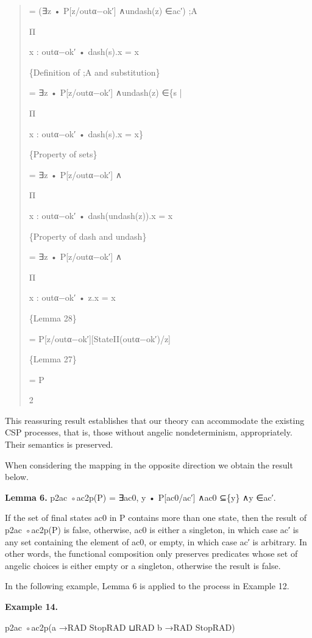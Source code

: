 \documentclass[11pt]{article}
\begin{document}
\begin{quote}\small\raggedright
= (∃z • P[z/outα−ok′] ∧undash(z) ∈ac′) ;A
\par
Π
\par
x : outα−ok′ • dash(s).x = x
\par
\{Definition of ;A and substitution\}
\par
= ∃z • P[z/outα−ok′] ∧undash(z) ∈\{s |
\par
Π
\par
x : outα−ok′ • dash(s).x = x\}
\par
\{Property of sets\}
\par
= ∃z • P[z/outα−ok′] ∧
\par
Π
\par
x : outα−ok′ • dash(undash(z)).x = x
\par
\{Property of dash and undash\}
\par
= ∃z • P[z/outα−ok′] ∧
\par
Π
\par
x : outα−ok′ • z.x = x
\par
\{Lemma 28\}
\par
= P[z/outα−ok′][StateII(outα−ok′)/z]
\par
\{Lemma 27\}
\par
= P
\par
2
\end{quote}

This reassuring result establishes that our theory can accommodate the existing CSP processes, that is, those without angelic nondeterminism, appropriately. Their semantics is preserved.

When considering the mapping in the opposite direction we obtain the result below.

\noindent\textbf{Lemma 6.} p2ac ◦ac2p(P) = ∃ac0, y • P[ac0/ac′] ∧ac0 ⊆\{y\} ∧y ∈ac′.


If the set of final states ac0 in P contains more than one state, then the result of p2ac ◦ac2p(P) is false, otherwise, ac0 is either a singleton, in which case ac′ is any set containing the element of ac0, or empty, in which case ac′ is arbitrary. In other words, the functional composition only preserves predicates whose set of angelic choices is either empty or a singleton, otherwise the result is false.

In the following example, Lemma 6 is applied to the process in Example 12.

\noindent\textbf{Example 14.}


p2ac ◦ac2p(a →RAD StopRAD ⊔RAD b →RAD StopRAD)
\end{document}
